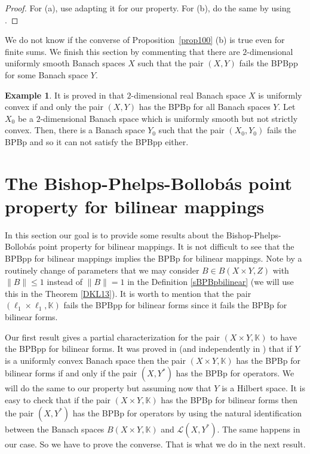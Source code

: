 \documentclass[12pt,a4paper]{amsart}
\theoremstyle{definition}
\newtheorem{example}[theorem]{Example}
\numberwithin{equation}{section}
\newcommand{\K}{\mathbb{K}} %
\def\K{{\mathbb K}}
\begin{document}
\begin{proof} For (a), use \cite[Proposition 2.4]{ACKLM} adapting it for our property. For (b), do the same by using \cite[Proposition 2.7]{ACKLM}.
\end{proof}

We do not know if the converse of Proposition~\ref{prop100} (b) is true even for finite sums. We finish this section by commenting that there are $2$-dimensional uniformly smooth Banach spaces $X$ such that the pair $(X, Y)$ fails the BPBpp for some Banach space $Y$. 


\begin{example} It is proved in \cite[Corollary 3.3]{KL} that $2$-dimensional real Banach space $X$ is uniformly convex if and only the pair $(X, Y)$ has the BPBp for all Banach spaces $Y$. Let $X_0$ be a $2$-dimensional Banach space which is  uniformly smooth but not strictly convex. Then, there is a Banach space $Y_0$ such that the pair $(X_0, Y_0)$ fails the BPBp and so it can not satisfy the BPBpp either.
\end{example}


















\section{The Bishop-Phelps-Bollob\'as point property for bilinear mappings}

In this section our goal is to provide some results about the Bishop-Phelps-Bollob\'as point property for bilinear mappings.  It is not difficult to see that the BPBpp for bilinear mappings implies the BPBp for bilinear mappings. Note by a routinely change of parameters that we may consider $B \in B(X \times Y, Z)$ with $\|B\| \leq 1$ instead of $\|B\| = 1$ in the Definition \ref{sBPBpbilinear} (we will use this in the Theorem \ref{DKL13}). It is worth to mention that the pair $(\ell_1 \times \ell_1, \K)$ fails the BPBpp for bilinear forms since it fails the BPBp for bilinear forms.



Our first result gives a partial characterization for the pair $(X \times Y, \K)$ to have the BPBpp for bilinear forms. It was proved in \cite[Proposition 2.4]{ABGM} (and independently in \cite[Theorem 1.1]{Dai}) that if $Y$ is a uniformly convex Banach space then the pair $(X \times Y, \K)$ has the BPBp for bilinear forms if and only if the pair $(X, Y^*)$ has the BPBp for operators. We will do the same to our property but assuming now that $Y$ is a Hilbert space. It is easy to check that if the pair $(X \times Y, \K)$ has the BPBp for bilinear forms then the pair $(X, Y^*)$ has the BPBp for operators by using the natural identification between the Banach spaces $B(X \times Y, \K)$ and $\mathcal{L}(X, Y^*)$. The same happens in our case. So we have to prove the converse. That is what we do in the next result.
\end{document}
